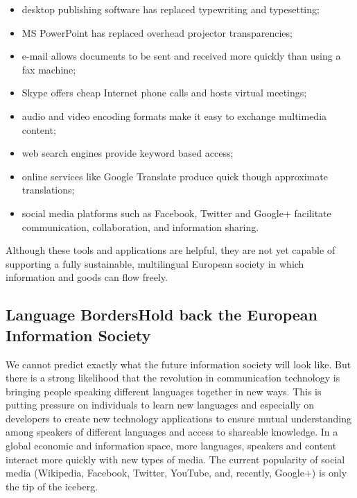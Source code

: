 \begin{multicols}{2}
\begin{itemize}
\item desktop publishing software has replaced typewriting and typesetting;
\item MS PowerPoint has replaced overhead projector transparencies;
\item e-mail allows documents to be sent and received more quickly than using a fax machine;
\item Skype offers cheap Internet phone calls and hosts virtual meetings;
\item audio and video encoding formats make it easy to exchange multimedia content;
\item web search engines provide keyword based access;
\item online services like Google Translate produce quick though approximate translations;
\item social media platforms such as Facebook, Twitter and Google+ facilitate communication, collaboration, and information sharing.
\end{itemize}

Although these tools and applications are helpful, they are not yet capable of supporting a fully sustainable, multilingual European society in which information and goods can flow freely.

\subsection[Language Borders Hold back the European Information Society]{Language Borders\newline Hold back the European Information Society}

We cannot predict exactly what the future information society will look like. But there is a strong likelihood that the revolution in communication technology is bringing people speaking different languages together in new ways. This is putting pressure on individuals to learn new languages and especially on developers to create new technology applications to ensure mutual understanding among speakers of different languages and access to shareable knowledge. In a global economic and information space, more languages, speakers and content interact more quickly with new types of media. The current popularity of social media (Wikipedia, Facebook, Twitter, YouTube, and, recently, Google+) is only the tip of the iceberg.



\end{multicols}
